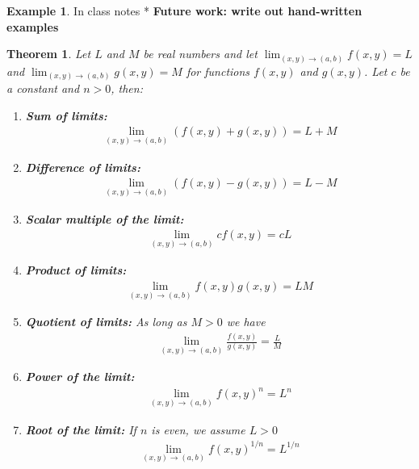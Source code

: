 \documentclass[
]{book}
\newtheorem{theorem}{Theorem}[chapter]
\theoremstyle{definition}
\theoremstyle{definition}
\newtheorem{example}{Example}[chapter]
\theoremstyle{definition}
\theoremstyle{definition}
\theoremstyle{remark}
\begin{document}
\begin{example}
In class notes
* \textbf{Future work: write out hand-written examples}
\end{example}

\begin{theorem}

Let \(L\) and \(M\) be real numbers and let \(\lim_{(x, y) \rightarrow (a, b)}f(x, y) = L\) and \(\lim_{(x, y) \rightarrow (a, b)}g(x, y) = M\) for functions \(f(x, y)\) and \(g(x, y)\). Let \(c\) be a constant and \(n>0\), then:

\begin{enumerate}
\def\labelenumi{\arabic{enumi})}
\item
  \textbf{Sum of limits:}
  \[
  \begin{aligned}
  \lim_{(x, y) \rightarrow (a, b)} \left( f(x, y) + g(x, y) \right) = L + M
  \end{aligned}
  \]
\item
  \textbf{Difference of limits:}
  \[
  \begin{aligned}
  \lim_{(x, y) \rightarrow (a, b)} \left( f(x, y) - g(x, y) \right) = L - M
  \end{aligned}
  \]
\item
  \textbf{Scalar multiple of the limit:}
  \[
  \begin{aligned}
  \lim_{(x, y) \rightarrow (a, b)} c f(x, y) = c L
  \end{aligned}
  \]
\item
  \textbf{Product of limits:}
  \[
  \begin{aligned}
  \lim_{(x, y) \rightarrow (a, b)} f(x, y) g(x, y) = LM
  \end{aligned}
  \]
\item
  \textbf{Quotient of limits:} As long as \(M>0\) we have
  \[
  \begin{aligned}
  \lim_{(x, y) \rightarrow (a, b)} \frac{f(x, y)}{g(x, y)} = \frac{L}{M}
  \end{aligned}
  \]
\item
  \textbf{Power of the limit:}
  \[
  \begin{aligned}
  \lim_{(x, y) \rightarrow (a, b)} f(x, y)^n = L^n
  \end{aligned}
  \]
\item
  \textbf{Root of the limit:} If \(n\) is even, we assume \(L > 0\)
  \[
  \begin{aligned}
  \lim_{(x, y) \rightarrow (a, b)} f(x, y)^{1/n} = L^{1/n}
  \end{aligned}
  \]
\end{enumerate}

\end{theorem}
\end{document}
